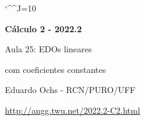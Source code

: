 \documentclass[oneside,12pt]{article}
\begin{document}
\catcode`\^^J=10
\pu
\def\pictgridstyle{\color{GrayPale}\linethickness{0.3pt}}
\def\pictaxesstyle{\linethickness{0.5pt}}
\def\pictnaxesstyle{\color{GrayPale}\linethickness{0.5pt}}
\celllower=2.5pt


\def\u#1{\par{\footnotesize \url{#1}}}

\def\drafturl{http://angg.twu.net/LATEX/2022-2-C2.pdf}
\def\drafturl{http://angg.twu.net/2022.2-C2.html}
\def\draftfooter{\tiny \href{\drafturl}{\jobname{}} \ColorBrown{\shorttoday{} \hours}}



%

\thispagestyle{empty}

\begin{center}

\vspace*{1.2cm}

{\bf \Large Cálculo 2 - 2022.2}

\bsk

Aula 25: EDOs lineares

com coeficientes constantes

\bsk

Eduardo Ochs - RCN/PURO/UFF

\url{http://angg.twu.net/2022.2-C2.html}

\end{center}

\newpage

\end{document}
